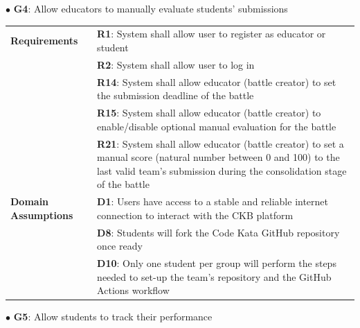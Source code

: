 $\bullet$ \textbf{G4}: Allow educators to manually evaluate students' submissions
\begin{center}
    \begin{tabular}{ |m{3cm}|m{10cm}| }
        \hline
        \textbf{Requirements} 
        & \textbf{R1}: System shall allow user to register as educator or student \\
        & \textbf{R2}: System shall allow user to log in \\
        & \textbf{R14}: System shall allow educator (battle creator) to set the submission deadline of the battle \\
        & \textbf{R15}: System shall allow educator (battle creator) to enable/disable optional manual evaluation for the battle \\
        & \textbf{R21}: System shall allow educator (battle creator) to set a manual score (natural number between 0 and 100) to the last valid team’s submission during the consolidation stage of the battle \\
        \hline
        \textbf{Domain \newline Assumptions} 
        & \textbf{D1}: Users have access to a stable and reliable internet connection to interact with the CKB platform \\
        & \textbf{D8}: Students will fork the Code Kata GitHub repository once ready \\
        & \textbf{D10}: Only one student per group will perform the steps needed to set-up the team's repository and the GitHub Actions workflow \\
        \hline
    \end{tabular}
\end{center} 
\newpage
$\bullet$ \textbf{G5}: Allow students to track their performance
